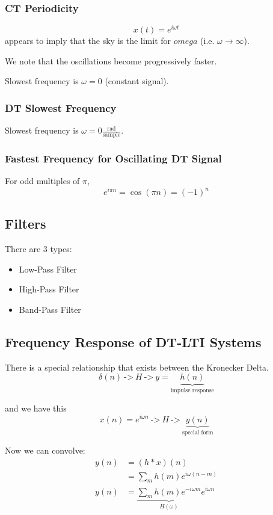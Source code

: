 \subsubsection{CT Periodicity}
\[
    x(t) = e^{i\omega t}
\]
appears to imply that the sky is the limit for $omega$ (i.e. $\omega\to\infty$).

We note that the oscillations become progressively faster.

Slowest frequency is $\omega = 0$ (constant signal).

\subsubsection{DT Slowest Frequency}
Slowest frequency is $\omega = 0\frac{\text{rad}}{\text{sample}}$.

\subsubsection{Fastest Frequency for Oscillating DT Signal}
For odd multiples of $\pi$,
\[
    e^{i\pi n} = \cos(\pi n) = (-1)^n
\]

\subsection{Filters}
There are 3 types:
\begin{itemize}
    \item Low-Pass Filter
    \item High-Pass Filter
    \item Band-Pass Filter
\end{itemize}

\subsection{Frequency Response of DT-LTI Systems}
There is a special relationship that exists between the Kronecker Delta.
\[
    \delta(n) \ \texttt{->} \ \boxed{H} \ \texttt{->} \  y=\underbrace{h(n)}_\text{impulse response}
\]

and we have this
\[
    x(n) = e^{i\omega n} \ \texttt{->} \ \boxed{H} \ \texttt{->} \  \underbrace{y(n)}_\text{special form}
\]

Now we can convolve:
\begin{align*}
    y(n) &= (h\ast x)(n)
    \\
    &= \sum_m h(m)e^{i\omega(n-m)}
    \\
    y(n) &= \underbrace{\sum_m h(m) e^{-i\omega m}}_{H(\omega)} e^{i\omega n}
\end{align*}

